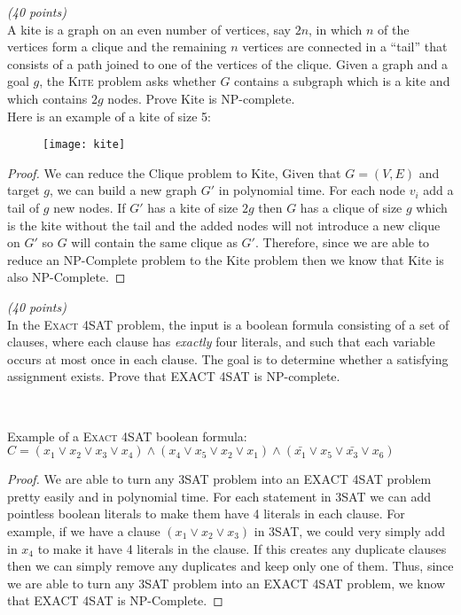 \documentclass{article}
\newcounter{ProblemCounter}
\newenvironment{problem}[1][Problem]{
 \begin{trivlist}
 \item[\hskip \labelsep {\bfseries #1}\hskip \labelsep {%
 \bfseries \theProblemCounter.%
 \stepcounter{ProblemCounter}%
 }]
}{
 \end{trivlist}
}
\begin{document}
\pagebreak

\begin{problem}\textit{(40 points)}\\
A kite is a graph on an even number of vertices, say $2n$, in which $n$ of the vertices form a clique and the remaining $n$ vertices are connected in a “tail” that consists of a path joined to one of the vertices of the clique. Given a graph and a goal $g$, the \textsc{Kite} problem asks whether $G$ contains a subgraph which is a kite and which contains $2g$ nodes. Prove Kite is NP-complete. \\

\noindent Here is an example of a kite of size 5:
\begin{figure}[htp]
    \centering
    \texttt{[image: kite]}
\end{figure}
\end{problem}

\begin{proof}
We can reduce the Clique problem to Kite, Given that $G = (V, E)$ and target $g$, we can build a new graph $G'$ in polynomial time. For each node $v_i$ add a tail of $g$ new nodes. If $G'$ has a kite of size $2g$ then $G$ has a clique of size $g$ which is the kite without the tail and the added nodes will not introduce a new clique on $G'$ so $G$ will contain the same clique as $G'$. Therefore, since we are able to reduce an NP-Complete problem to the Kite problem then we know that Kite is also NP-Complete.
\end{proof}

\pagebreak

\begin{problem}\textit{(40 points)}\\
In the \textsc{Exact 4SAT} problem, the input is a boolean formula consisting of a set of clauses, where each clause has \textit{exactly} four literals, and such that each variable occurs at most once in each clause. The goal is to determine whether a satisfying assignment exists. Prove that \textsc{EXACT 4SAT} is NP-complete.

\

\noindent Example of a \textsc{Exact 4SAT} boolean formula:\\
$C = (x_1 \vee x_2 \vee x_3 \vee x_4) \wedge (x_4 \vee x_5 \vee x_2 \vee x_1) \wedge (\bar{x_1} \vee x_5 \vee \bar{x_3} \vee x_6)$
\end{problem}

\begin{proof}
We are able to turn any 3SAT problem into an EXACT 4SAT problem pretty easily and in polynomial time. For each statement in 3SAT we can add pointless boolean literals to make them have 4 literals in each clause. For example, if we have a clause $(x_1 \vee x_2 \vee x_3)$ in 3SAT, we could very simply add in $x_4$ to make it have 4 literals in the clause. If this creates any duplicate clauses then we can simply remove any duplicates and keep only one of them. Thus, since we are able to turn any 3SAT problem into an EXACT 4SAT problem, we know that EXACT 4SAT is NP-Complete.
\end{proof}
\end{document}

